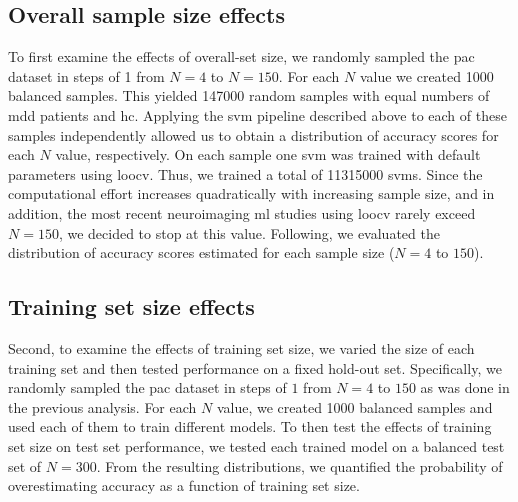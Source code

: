 \documentclass[12pt,a4paper]{article}
\begin{document}
    \subsection{Overall sample size effects}
    To first examine the effects of overall-set size, we randomly sampled the \ac{pac} dataset in steps of \num{1} from $N=4$ to $N=150$. For each $N$ value we created \num{1000} balanced samples. This yielded \num{147000} random samples with equal numbers of \ac{mdd} patients and \ac{hc}. Applying the \ac{svm} pipeline described above to each of these samples independently allowed us to obtain a distribution of accuracy scores for each $N$ value, respectively. On each sample one \ac{svm} was trained with default parameters using \ac{loocv}. Thus, we trained a total of \num{11315000} \acp{svm}. Since the computational effort increases quadratically with increasing sample size, and in addition, the most recent neuroimaging \ac{ml} studies using \ac{loocv} rarely exceed $N=150$, we decided to stop at this value. Following, we evaluated the distribution of accuracy scores estimated for each sample size ($N=4$ to $150$).

    \subsection{Training set size effects}
    Second, to examine the effects of training set size, we varied the size of each training set and then tested performance on a fixed hold-out set. Specifically, we randomly sampled the \ac{pac} dataset in steps of $1$ from $N=4$ to $150$ as was done in the previous analysis. For each $N$ value, we created \num{1000} balanced samples and used each of them to train different models. To then test the effects of training set size on test set performance, we tested each trained model on a balanced test set of $N=300$. From the resulting distributions, we quantified the probability of overestimating accuracy as a function of training set size.
\end{document}
